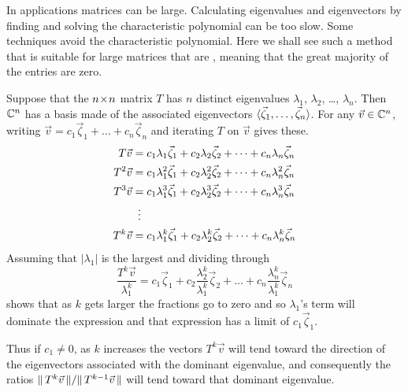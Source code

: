 In applications matrices can be large.
Calculating eigenvalues and eigenvectors by
finding and solving the characteristic polynomial
can be too slow. 
Some techniques avoid the characteristic polynomial. 
Here we shall see such a method that is suitable for large matrices that are
, 
meaning that the great majority of the entries are zero.

Suppose that the $n \! \times \! n$ matrix $T$ has $n$ distinct eigenvalues
$\lambda_1$, $\lambda_2$, \ldots, $\lambda_n$.
Then $\mathbb{C}^n$ has a basis made of the associated eigenvectors
$\langle\vec{\zeta}_1,\dots,\vec{\zeta}_n\rangle$.
For any $\vec{v}\in\mathbb{C}^n$, writing
$\vec{v}=c_1\vec{\zeta}_1+\dots+c_n\vec{\zeta}_n$ and iterating $T$ on $\vec{v}$
gives these.
\begin{align*}
  T\vec{v} 
      &=c_1\lambda_1\vec{\zeta}_1+c_2\lambda_2\vec{\zeta}_2+
                              \dots+c_n\lambda_n\vec{\zeta}_n  \\
  T^2\vec{v} 
      &=c_1\lambda_1^2\vec{\zeta}_1+c_2\lambda_2^2\vec{\zeta}_2+
                              \dots+c_n\lambda_n^2\vec{\zeta}_n  \\
  T^3\vec{v} 
      &=c_1\lambda_1^3\vec{\zeta}_1+c_2\lambda_2^3\vec{\zeta}_2+
                              \dots+c_n\lambda_n^3\vec{\zeta}_n  \\
      &\vdotswithin{=}                                            \\
  T^k\vec{v} 
      &=c_1\lambda_1^k\vec{\zeta}_1+c_2\lambda_2^k\vec{\zeta}_2+
                              \dots+c_n\lambda_n^k\vec{\zeta}_n  
\end{align*}
Assuming that $|\lambda_1|$
is the largest and dividing through
\begin{equation*}
  \frac{T^k\vec{v}}{\lambda_1^k} 
      =c_1\vec{\zeta}_1+c_2\frac{\lambda_2^k}{\lambda_1^k}\vec{\zeta}_2+
                    \dots+c_n\frac{\lambda_n^k}{\lambda_1^k}\vec{\zeta}_n  
\end{equation*} 
shows that as $k$ gets larger the fractions go to zero
and so $\lambda_1$'s term will dominate the expression and
that expression has a limit of $c_1\vec{\zeta}_1$.

Thus if $c_1\neq 0$, 
as $k$ increases the vectors $T^k\vec{v}$ will tend toward the direction of 
the eigenvectors associated with the dominant eigenvalue,
and consequently
the ratios $\lVert\,T^{k}\vec{v}\,\rVert/\lVert\,T^{k-1}\vec{v}\,\rVert$ 
will tend toward that dominant eigenvalue.

